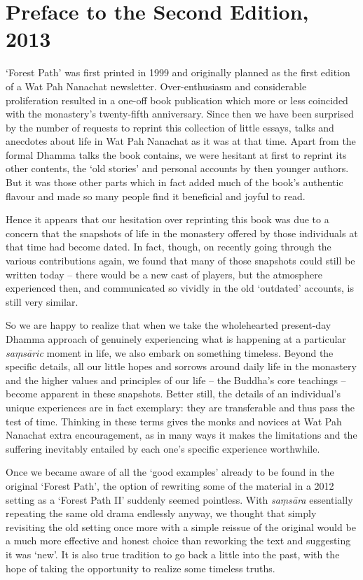 
\chapter{Preface to the Second Edition, 2013}

`Forest Path' was first printed in 1999 and originally planned as the
first edition of a Wat Pah Nanachat newsletter. Over-enthusiasm and
considerable proliferation resulted in a one-off book publication which
more or less coincided with the monastery's twenty-fifth anniversary.
Since then we have been surprised by the number of requests to reprint
this collection of little essays, talks and anecdotes about life in Wat
Pah Nanachat as it was at that time. Apart from the formal Dhamma talks
the book contains, we were hesitant at first to reprint its other
contents, the `old stories' and personal accounts by then younger
authors. But it was those other parts which in fact added much of the
book's authentic flavour and made so many people find it beneficial and
joyful to read.

Hence it appears that our hesitation over reprinting this book was due
to a concern that the snapshots of life in the monastery offered by
those individuals at that time had become dated. In fact, though, on
recently going through the various contributions again, we found that
many of those snapshots could still be written today -- there would be a
new cast of players, but the atmosphere experienced then, and
communicated so vividly in the old `outdated' accounts, is still very
similar.

So we are happy to realize that when we take the wholehearted
present-day Dhamma approach of genuinely experiencing what is happening
at a particular \emph{saṃsāric} moment in life, we also embark on
something timeless. Beyond the specific details, all our little hopes
and sorrows around daily life in the monastery and the higher values and
principles of our life -- the Buddha's core teachings -- become apparent
in these snapshots. Better still, the details of an individual's unique
experiences are in fact exemplary: they are transferable and thus pass
the test of time. Thinking in these terms gives the monks and novices at
Wat Pah Nanachat extra encouragement, as in many ways it makes the
limitations and the suffering inevitably entailed by each one's specific
experience worthwhile.

Once we became aware of all the `good examples' already to be found in
the original `Forest Path', the option of rewriting some of the material
in a 2012 setting as a `Forest Path II' suddenly seemed pointless. With
\emph{saṃsāra} essentially repeating the same old drama endlessly
anyway, we thought that simply revisiting the old setting once more with
a simple reissue of the original would be a much more effective and
honest choice than reworking the text and suggesting it was `new'. It is
also true tradition to go back a little into the past, with the hope of
taking the opportunity to realize some timeless truths.

